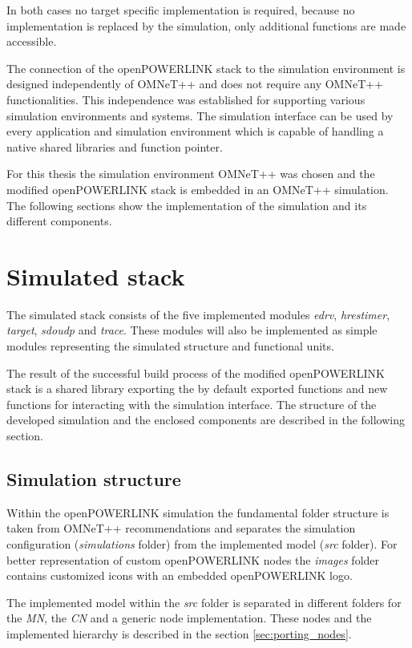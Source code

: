 In both cases no target specific implementation is required, because no implementation is replaced by the simulation, only additional functions are made accessible.

The connection of the openPOWERLINK stack to the simulation environment is designed independently of OMNeT++ and does not require any OMNeT++ functionalities.
This independence was established for supporting various simulation environments and systems.
The simulation interface can be used by every application and simulation environment which is capable of handling a native shared libraries and function pointer.

For this thesis the simulation environment OMNeT++ was chosen and the modified openPOWERLINK stack is embedded in an OMNeT++ simulation.
The following sections show the implementation of the simulation and its different components.

\section{Simulated stack}
\label{sec:porting_stack}
The simulated stack consists of the five implemented modules \emph{edrv}, \emph{hrestimer}, \emph{target}, \emph{sdoudp} and \emph{trace}.
These modules will also be implemented as simple modules representing the simulated structure and functional units.

The result of the successful build process of the modified openPOWERLINK stack is a shared library exporting the by default exported functions and new functions for interacting with the simulation interface.
The structure of the developed simulation and the enclosed components are described in the following section.

\subsection{Simulation structure}
\label{sec:porting_stack_simstructure}
Within the openPOWERLINK simulation the fundamental folder structure is taken from OMNeT++ recommendations and separates the simulation configuration (\emph{simulations} folder) from the implemented model (\emph{src} folder).
For better representation of custom openPOWERLINK nodes the \emph{images} folder contains customized icons with an embedded openPOWERLINK logo.

The implemented model within the \emph{src} folder is separated in different folders for the \emph{MN}, the \emph{CN} and a generic node implementation.
These nodes and the implemented hierarchy is described in the section \ref{sec:porting_nodes}.

